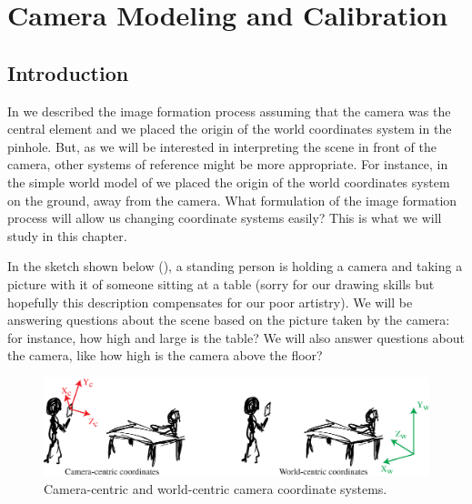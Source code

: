 \chapter{Camera Modeling and Calibration}
\label{sec:camera_parameters}


\section{Introduction}

In \chap{\ref{chapter:imaging}} we described the image formation process assuming that the camera was the central element and we placed the origin of the world coordinates system in the pinhole. But, as we will be interested in interpreting the scene in front of the camera, other systems of reference might be more appropriate. For instance, in the simple world model of \chap{\ref{chapter:simplesystem}} we placed the origin of the world coordinates system on the ground, away from the camera. What formulation of the image formation process will allow us changing coordinate systems easily? This is what we will study in this chapter. 

In the sketch shown below (\fig{\ref{fig:world_and_camera_coordinates}}), a standing person is holding a camera and taking a picture with it of someone sitting at a table (sorry for our drawing skills but hopefully this description compensates for our poor artistry). We will be answering questions about the scene based on the picture taken by the camera: for instance, how high and large is the table?  We will also answer questions about the camera, like how high is the camera above the floor? 

\begin{figure}[h]
\centerline{
\includegraphics[width=1\linewidth]{figures/imaging_geometry/world_and_camera_coordinates.eps}
}
\caption{Camera-centric and world-centric camera coordinate systems.}
\label{fig:world_and_camera_coordinates}
\end{figure}

